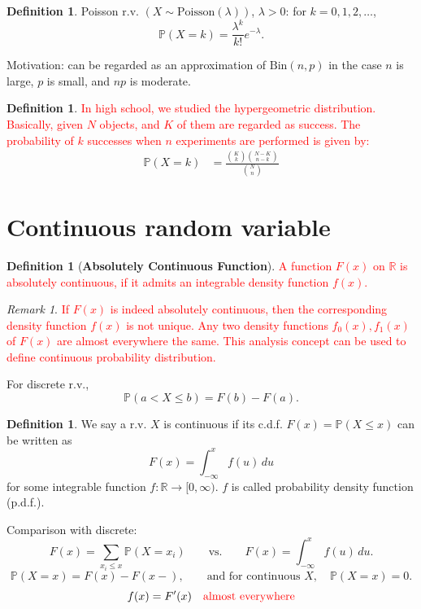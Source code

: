 \documentclass[11pt]{article}
\theoremstyle{plain}
\theoremstyle{definition}
\newtheorem{definition}[theorem]{Definition}
\theoremstyle{remark}
\newtheorem{remark}[theorem]{Remark}
\begin{document}
	\begin{definition}
		Poisson r.v. \((X\sim \mathrm{Poisson}(\lambda))\), \(\lambda>0\):
		for \(k=0,1,2,\dots\),
		\[
		\mathbb{P}(X=k)=\frac{\lambda^k}{k!}e^{-\lambda}.
		\]
	\end{definition}
	
	Motivation: can be regarded as an approximation of \(\mathrm{Bin}(n,p)\) in the case
	\(n\) is large, \(p\) is small, and \(np\) is moderate.
	
	\begin{definition}
		\textcolor{red}{In high school, we studied the hypergeometric distribution. Basically, given $N$ objects, and $K$ of them are regarded as success. The probability of $k$ successes when $n$ experiments are performed is given by:}
		\begin{align*}
			\mathbb{P}(X=k)
			& =
			\frac{{K\choose k}{N-K\choose n-k}}{{N\choose n}}
		\end{align*}
	\end{definition}
	
	\section{Continuous random variable}
	
	\begin{definition}
		[\textbf{Absolutely Continuous Function}]
		\textcolor{red}{A function $F(x)$ on $\mathbb{R}$ is absolutely continuous, if it admits an integrable density function $f(x)$.}
	\end{definition}
	\begin{remark}
		\textcolor{red}{If $F(x)$ is indeed absolutely continuous, then the corresponding density function $f(x)$ is not unique. Any two density functions $f_0(x),f_1(x)$ of $F(x)$ are almost everywhere the same. This analysis concept can be used to define continuous probability distribution.}
	\end{remark}
	
	For discrete r.v.,
	\[
	\mathbb{P}(a<X\le b)=F(b)-F(a).
	\]
	
	\begin{definition}
		We say a r.v. \(X\) is continuous if its c.d.f. \(F(x)=\mathbb{P}(X\le x)\) can be written as
		\[
		F(x)=\int_{-\infty}^{x} f(u)\,du
		\]
		for some integrable function \(f:\mathbb{R}\to[0,\infty)\).
		\(f\) is called probability density function (p.d.f.).
	\end{definition}
	
	Comparison with discrete:
	\[
	F(x)=\sum_{x_i\le x}\mathbb{P}(X=x_i)
	\qquad\text{vs.}\qquad
	F(x)=\int_{-\infty}^{x} f(u)\,du.
	\]
	\[
	\mathbb{P}(X=x)=F(x)-F(x-),
	\qquad
	\text{and for continuous }X,\quad \mathbb{P}(X=x)=0.
	\]
	\[
	f(x)=F'(x)\quad\text{\textcolor{red}{almost everywhere}}
	\]
	
\end{document}
